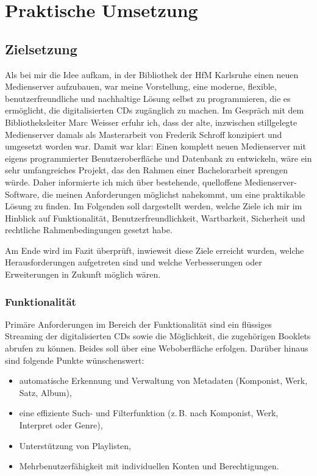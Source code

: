 \documentclass[12pt,a4paper]{report}
\begin{document}
\chapter*{Praktische Umsetzung}
\setcounter{section}{0}

\section{Zielsetzung}
Als bei mir die Idee aufkam, in der Bibliothek der \ac{HfM} Karlsruhe einen neuen Medienserver aufzubauen, war meine Vorstellung, eine moderne, flexible, benutzerfreundliche 
und nachhaltige Lösung selbst zu programmieren, die es ermöglicht, die digitalisierten CDs zugänglich zu machen.
Im Gespräch mit dem Bibliotheksleiter Marc Weisser erfuhr ich, dass der alte, inzwischen stillgelegte Medienserver damals als Masterarbeit von Frederik Schroff konzipiert und umgesetzt worden war.
Damit war klar: Einen komplett neuen Medienserver mit eigens programmierter Benutzeroberfläche 
und Datenbank zu entwickeln, wäre ein sehr umfangreiches Projekt, das den Rahmen einer Bachelorarbeit sprengen würde.
Daher informierte ich mich über bestehende, quelloffene Medienserver-Software, die meinen Anforderungen möglichst nahekommt, um eine praktikable Lösung zu finden. 
Im Folgenden soll dargestellt werden, welche Ziele ich mir im Hinblick auf Funktionalität, Benutzerfreundlichkeit, Wartbarkeit, Sicherheit und rechtliche Rahmenbedingungen gesetzt habe.
  
Am Ende wird im Fazit überprüft, inwieweit diese Ziele erreicht wurden, welche Herausforderungen aufgetreten sind 
und welche Verbesserungen oder Erweiterungen in Zukunft möglich wären.

  \subsection{Funktionalität}
  Primäre Anforderungen im Bereich der Funktionalität sind ein flüssiges Streaming der digitalisierten CDs sowie die Möglichkeit, die zugehörigen Booklets abrufen zu können.
  Beides soll über eine Weboberfläche erfolgen.  
  Darüber hinaus sind folgende Punkte wünschenswert:
  \begin{itemize}
    \item automatische Erkennung und Verwaltung von Metadaten (Komponist, Werk, Satz, Album),
    \item eine effiziente Such- und Filterfunktion (z.\,B. nach Komponist, Werk, Interpret oder Genre),
    \item Unterstützung von Playlisten,
    \item Mehrbenutzerfähigkeit mit individuellen Konten und Berechtigungen.
  \end{itemize}
\end{document}
